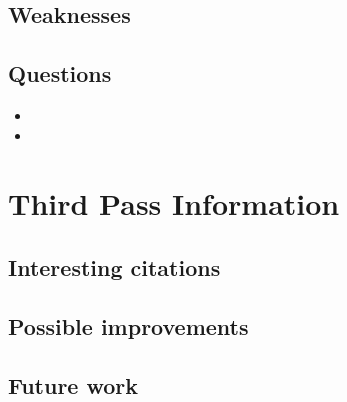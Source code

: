 \subsection{Weaknesses}


\subsection{Questions}


\begin{itemize}
    \item
    \item
\end{itemize}

\section{Third Pass Information}

\subsection{Interesting citations}


\subsection{Possible improvements}


\subsection{Future work}




